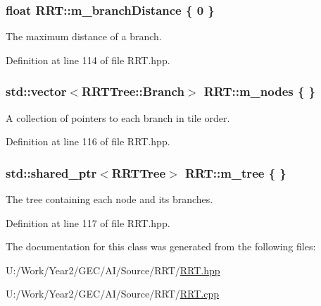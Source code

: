 \hypertarget{classRRT_a2aaaa69617cfd685ae1d504e3cf31317}{
\subsubsection[{m\+\_\+branch\+Distance}]{\setlength{\rightskip}{0pt plus 5cm}float R\+R\+T\+::m\+\_\+branch\+Distance \{ 0 \}\hspace{0.3cm}{\ttfamily [private]}}}\label{classRRT_a2aaaa69617cfd685ae1d504e3cf31317}


The maximum distance of a branch. 



Definition at line 114 of file R\+R\+T.\+hpp.

\hypertarget{classRRT_a25e924b6450a7dc97c4ecff2735b5889}{
\subsubsection[{m\+\_\+nodes}]{\setlength{\rightskip}{0pt plus 5cm}std\+::vector$<$R\+R\+T\+Tree\+::\+Branch$>$ R\+R\+T\+::m\+\_\+nodes \{ \}\hspace{0.3cm}{\ttfamily [private]}}}\label{classRRT_a25e924b6450a7dc97c4ecff2735b5889}


A collection of pointers to each branch in tile order. 



Definition at line 116 of file R\+R\+T.\+hpp.

\hypertarget{classRRT_a2905ea09c16ae59d6ee1beae15d12b2e}{
\subsubsection[{m\+\_\+tree}]{\setlength{\rightskip}{0pt plus 5cm}std\+::shared\+\_\+ptr$<${\bf R\+R\+T\+Tree}$>$ R\+R\+T\+::m\+\_\+tree \{ \}\hspace{0.3cm}{\ttfamily [private]}}}\label{classRRT_a2905ea09c16ae59d6ee1beae15d12b2e}


The tree containing each node and its branches. 



Definition at line 117 of file R\+R\+T.\+hpp.



The documentation for this class was generated from the following files\+:\begin{DoxyCompactItemize}
\item 
U\+:/\+Work/\+Year2/\+G\+E\+C/\+A\+I/\+Source/\+R\+R\+T/\hyperlink{RRT_8hpp}{R\+R\+T.\+hpp}\item 
U\+:/\+Work/\+Year2/\+G\+E\+C/\+A\+I/\+Source/\+R\+R\+T/\hyperlink{RRT_8cpp}{R\+R\+T.\+cpp}\end{DoxyCompactItemize}
